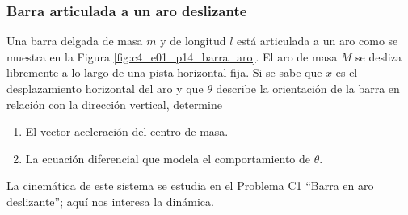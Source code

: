 \subsubsection{Barra articulada a un aro deslizante}

Una barra delgada de masa $m$ y de longitud $l$ está articulada a un aro como se muestra en la
Figura \ref{fig:c4_e01_p14_barra_aro}. El aro de masa $M$ se desliza libremente a lo largo de una
pista horizontal fija. Si se sabe que $x$ es el desplazamiento horizontal del aro y que $\theta$
describe la orientación de la barra en relación con la dirección vertical, determine
\begin{enumerate}
    \item El vector aceleración del centro de masa.
    \item La ecuación diferencial que modela el comportamiento de $\theta$.
\end{enumerate}
La cinemática de este sistema se estudia en el Problema C1 ``Barra en aro deslizante''; aquí nos
interesa la dinámica.

